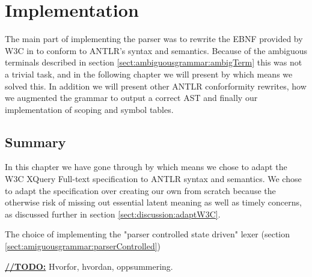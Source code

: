 \chapter{Implementation}


The main part of implementing the parser was to rewrite the EBNF provided by W3C in \cite{w3c01} to conform to ANTLR's syntax and semantics. Because of the ambiguous terminals described in section \ref{sect:ambiguousgrammar:ambigTerm} this was not a trivial task, and in the following chapter we will present by which means we solved this. In addition we will present other ANTLR conforformity rewrites, how we augmented the grammar to output a correct AST and finally our implementation of scoping and symbol tables.









\section{Summary}
In this chapter we have gone through by which means we chose to adapt the W3C XQuery Full-text specification to ANTLR syntax and semantics. We chose to adapt the specification over creating our own from scratch because the otherwise risk of missing out essential latent meaning as well as timely concerns, as discussed further in section \ref{sect:discussion:adaptW3C}.

The choice of implementing the "parser controlled state driven" lexer (section \ref{sect:amiguousgrammar:parserControlled})

\underline{\textbf{\LARGE //TODO:}}
Hvorfor, hvordan, oppsummering.
